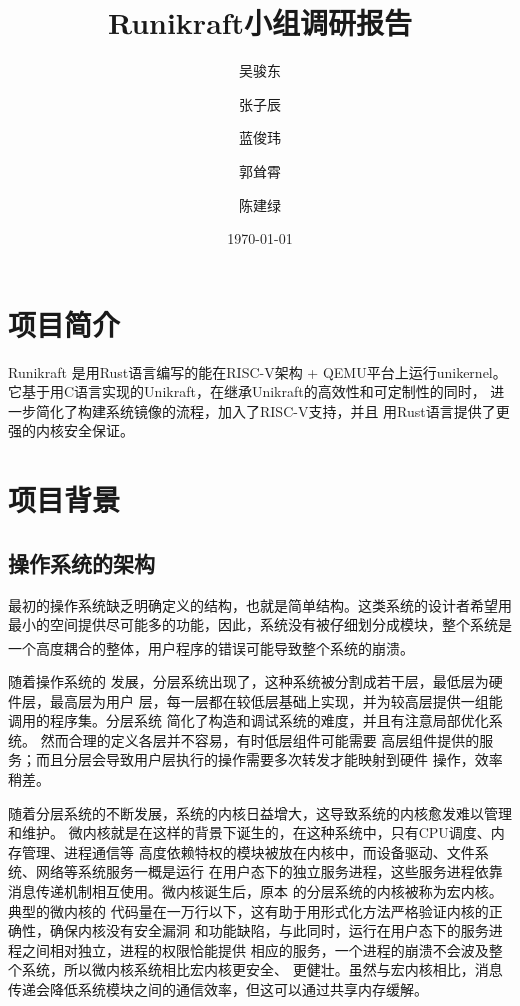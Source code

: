 \documentclass[UTF8,fontset=none,linespread=1.15]{ctexart}
\let\nosupcite\cite
\renewcommand*{\cite}[1]{\textsuperscript{\nosupcite{#1}}}
\begin{document}
\sffamily %
\title{\bfseries Runikraft小组\quad 调研报告}
\author{吴骏东\and 张子辰\and 蓝俊玮\and 郭耸霄\and 陈建绿}
\date{\today}
\maketitle

\tableofcontents

\section{项目简介}
Runikraft 是用Rust语言编写的能在RISC-V架构 + QEMU平台上运行unikernel。
它基于用C语言实现的Unikraft，在继承Unikraft的高效性和可定制性的同时，
进一步简化了构建系统镜像的流程，加入了RISC-V支持，并且
用Rust语言提供了更强的内核安全保证。
\section{项目背景}
\subsection{操作系统的架构}
最初的操作系统缺乏明确定义的结构，也就是简单结构。这类系统的设计者希望用
最小的空间提供尽可能多的功能，因此，系统没有被仔细划分成模块，整个系统是
一个高度耦合的整体，用户程序的错误可能导致整个系统的崩溃。\cite{bib:os-concept}

随着操作系统的
发展，分层系统出现了，这种系统被分割成若干层，最低层为硬件层，最高层为用户
层，每一层都在较低层基础上实现，并为较高层提供一组能调用的程序集。分层系统
简化了构造和调试系统的难度，并且有注意局部优化系统。
然而合理的定义各层并不容易，有时低层组件可能需要
高层组件提供的服务；而且分层会导致用户层执行的操作需要多次转发才能映射到硬件
操作，效率稍差。

随着分层系统的不断发展，系统的内核日益增大，这导致系统的内核愈发难以管理和维护。
微内核就是在这样的背景下诞生的，在这种系统中，只有CPU调度、内存管理、进程通信等
高度依赖特权的模块被放在内核中，而设备驱动、文件系统、网络等系统服务一概是运行
在用户态下的独立服务进程，这些服务进程依靠消息传递机制相互使用。微内核诞生后，原本
的分层系统的内核被称为宏内核。典型的微内核的
代码量在一万行以下，这有助于用形式化方法严格验证内核的正确性，确保内核没有安全漏洞
和功能缺陷，与此同时，运行在用户态下的服务进程之间相对独立，进程的权限恰能提供
相应的服务，一个进程的崩溃不会波及整个系统，所以微内核系统相比宏内核更安全、
更健壮。虽然与宏内核相比，消息传递会降低系统模块之间的通信效率，但这可以通过共享内存缓解。
\end{document}
